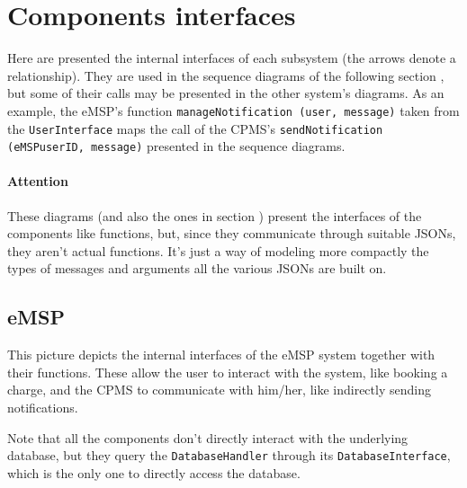 \pagebreak

\section{Components interfaces} \label{view:interfaces}

Here are presented the internal interfaces of each subsystem (the arrows denote a  relationship). They are used in the sequence diagrams of the following section , but some of their calls may be presented in the other system's diagrams. As an example, the eMSP's function \linebreak \texttt{manageNotification (user, message)} taken from the \texttt{UserInterface} maps the call of the CPMS's \linebreak \texttt{sendNotification (eMSPuserID, message)} presented in the sequence diagrams.

\paragraph{Attention} These diagrams (and also the ones in section ) present the interfaces of the components like functions, but, since they communicate through suitable JSONs, they aren't actual functions. It's just a way of modeling more compactly the types of messages and arguments all the various JSONs are built on.

\subsection{eMSP}

This picture depicts the internal interfaces of the eMSP system together with their functions. These allow the user to interact with the system, like booking a charge, and the CPMS to communicate with him/her, like indirectly sending notifications.\medskip

Note that all the components don't directly interact with the underlying database, but they query the \texttt{DatabaseHandler} through its \texttt{DatabaseInterface}, which is the only one to directly access the database.

